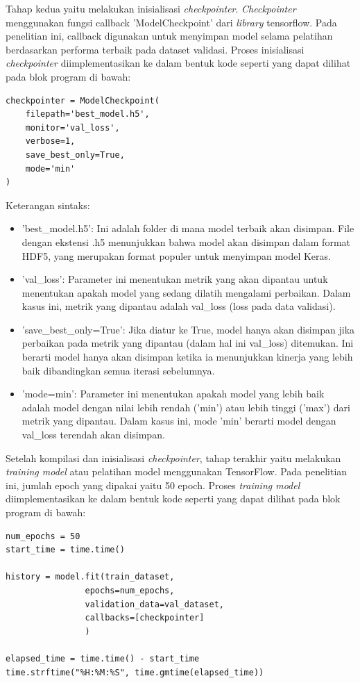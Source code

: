 Tahap kedua yaitu melakukan inisialisasi \textit{checkpointer}. \textit{Checkpointer} menggunakan fungsi callback 'ModelCheckpoint' dari \textit{library} tensorflow. Pada penelitian ini, callback digunakan untuk menyimpan model selama pelatihan berdasarkan performa terbaik pada dataset validasi. Proses inisialisasi \textit{checkpointer} diimplementasikan ke dalam bentuk kode seperti yang dapat dilihat pada blok program di bawah:
\begin{lstlisting}[style=customc]
checkpointer = ModelCheckpoint(
    filepath='best_model.h5',
    monitor='val_loss',
    verbose=1,
    save_best_only=True,
    mode='min'
)
\end{lstlisting}
Keterangan sintaks:
\begin{itemize}
    \item 'best\_model.h5': Ini adalah folder di mana model terbaik akan disimpan. File dengan ekstensi .h5 menunjukkan bahwa model akan disimpan dalam format HDF5, yang merupakan format populer untuk menyimpan model Keras.
    \item 'val\_loss': Parameter ini menentukan metrik yang akan dipantau untuk menentukan apakah model yang sedang dilatih mengalami perbaikan. Dalam kasus ini, metrik yang dipantau adalah val\_loss (loss pada data validasi).
    \item 'save\_best\_only=True': Jika diatur ke True, model hanya akan disimpan jika perbaikan pada metrik yang dipantau (dalam hal ini val\_loss) ditemukan. Ini berarti model hanya akan disimpan ketika ia menunjukkan kinerja yang lebih baik dibandingkan semua iterasi sebelumnya.
    \item 'mode=min': Parameter ini menentukan apakah model yang lebih baik adalah model dengan nilai lebih rendah ('min') atau lebih tinggi ('max') dari metrik yang dipantau. Dalam kasus ini, mode 'min' berarti model dengan val\_loss terendah akan disimpan.
\end{itemize}

Setelah kompilasi dan inisialisasi \textit{checkpointer}, tahap terakhir yaitu melakukan \textit{training model} atau pelatihan model menggunakan TensorFlow. Pada penelitian ini, jumlah epoch yang dipakai yaitu 50 epoch. Proses \textit{training model} diimplementasikan ke dalam bentuk kode seperti yang dapat dilihat pada blok program di bawah:

\begin{lstlisting}[style=customc]
num_epochs = 50
start_time = time.time()

history = model.fit(train_dataset,
                epochs=num_epochs,
                validation_data=val_dataset,
                callbacks=[checkpointer]
                )

elapsed_time = time.time() - start_time
time.strftime("%H:%M:%S", time.gmtime(elapsed_time))
\end{lstlisting}

